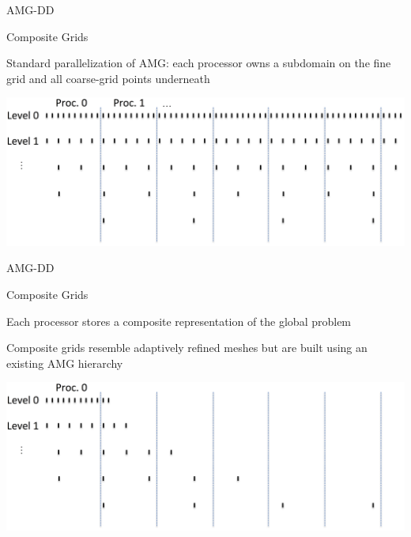 \documentclass[18pt,xcolor=table]{beamer}
\begin{document}
\begin{frame}{AMG-DD}
\begin{block}{Composite Grids}
\bit
\item Standard parallelization of AMG: each processor owns a subdomain on the fine grid and all coarse-grid points underneath
\eit
\end{block}
\centering
\includegraphics[width=\textwidth]{../figures/compGridCreation1D2}
\end{frame}

\begin{frame}{AMG-DD}
\begin{block}{Composite Grids}
\bit
\item Each processor stores a composite representation of the global problem
\item Composite grids resemble adaptively refined meshes but are built using an existing AMG hierarchy
\eit
\end{block}
\centering
\includegraphics[width=\textwidth]{../figures/compGridCreation1D13}
\end{frame}
\end{document}
